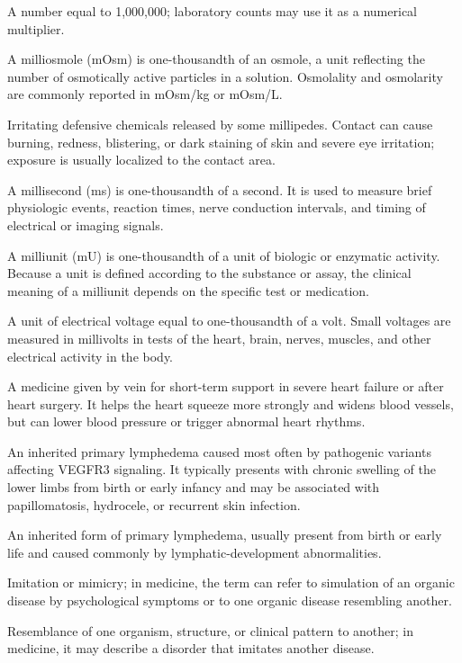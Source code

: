  A number equal to 1,000,000; laboratory counts may use it as a numerical multiplier.

 A milliosmole (mOsm) is one-thousandth of an osmole, a unit reflecting the number of osmotically active particles in a solution. Osmolality and osmolarity are commonly reported in mOsm/kg or mOsm/L.

 Irritating defensive chemicals released by some millipedes. Contact can cause burning, redness, blistering, or dark staining of skin and severe eye irritation; exposure is usually localized to the contact area.

 A millisecond (ms) is one-thousandth of a second. It is used to measure brief physiologic events, reaction times, nerve conduction intervals, and timing of electrical or imaging signals.

 A milliunit (mU) is one-thousandth of a unit of biologic or enzymatic activity. Because a unit is defined according to the substance or assay, the clinical meaning of a milliunit depends on the specific test or medication.

 A unit of electrical voltage equal to one-thousandth of a volt. Small voltages are measured in millivolts in tests of the heart, brain, nerves, muscles, and other electrical activity in the body.

 A medicine given by vein for short-term support in severe heart failure or after heart surgery. It helps the heart squeeze more strongly and widens blood vessels, but can lower blood pressure or trigger abnormal heart rhythms.

 An inherited primary lymphedema caused most often by pathogenic variants affecting
VEGFR3 signaling. It typically presents with chronic swelling of the lower limbs from
birth or early infancy and may be associated with papillomatosis, hydrocele, or
recurrent skin infection.

 An inherited form of primary lymphedema, usually present from birth or early life and caused commonly by lymphatic-development abnormalities.

 Imitation or mimicry; in medicine, the term can refer to simulation of an organic disease by psychological symptoms or to one organic disease resembling another.

 Resemblance of one organism, structure, or clinical pattern to another; in medicine, it may describe a disorder that imitates another disease.

